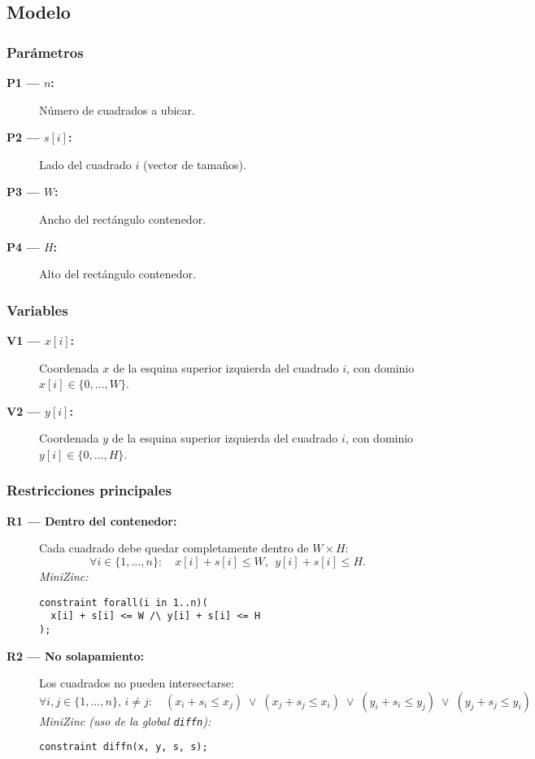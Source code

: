 
\subsection{Modelo}\label{sec:06-rectangulo-modelo}

\subsubsection*{Parámetros}
\begin{description}
  \item[\textbf{P1 — \(n\):}] Número de cuadrados a ubicar.
  \item[\textbf{P2 — \(s[i]\):}] Lado del cuadrado \(i\) (vector de tamaños).
  \item[\textbf{P3 — \(W\):}] Ancho del rectángulo contenedor.
  \item[\textbf{P4 — \(H\):}] Alto del rectángulo contenedor.
\end{description}

\subsubsection*{Variables}
\begin{description}
  \item[\textbf{V1 — \(x[i]\):}] Coordenada \(x\) de la esquina superior izquierda del cuadrado \(i\), con dominio \(x[i]\in\{0,\dots,W\}\).
  \item[\textbf{V2 — \(y[i]\):}] Coordenada \(y\) de la esquina superior izquierda del cuadrado \(i\), con dominio \(y[i]\in\{0,\dots,H\}\).
\end{description}

\subsubsection*{Restricciones principales}
\begin{description}
  \item[\textbf{R1 — Dentro del contenedor:}] Cada cuadrado debe quedar completamente dentro de \(W\times H\):
  \[
  \forall i\in\{1,\dots,n\}:\quad x[i]+s[i]\le W,\ \ y[i]+s[i]\le H.
  \]
  \textit{MiniZinc:}
\begin{verbatim}
constraint forall(i in 1..n)(
  x[i] + s[i] <= W /\ y[i] + s[i] <= H
);
\end{verbatim}

  \item[\textbf{R2 — No solapamiento:}] Los cuadrados no pueden intersectarse:
  \[
    \forall i, j \in \{1, \dots, n\}, \, i \ne j:
    \quad
    (x_i + s_i \le x_j) \;\lor\;
    (x_j + s_j \le x_i) \;\lor\;
    (y_i + s_i \le y_j) \;\lor\;
    (y_j + s_j \le y_i)
  \]
  \textit{MiniZinc (uso de la global \texttt{diffn}):}
\begin{verbatim}
constraint diffn(x, y, s, s);
\end{verbatim}
\end{description}

